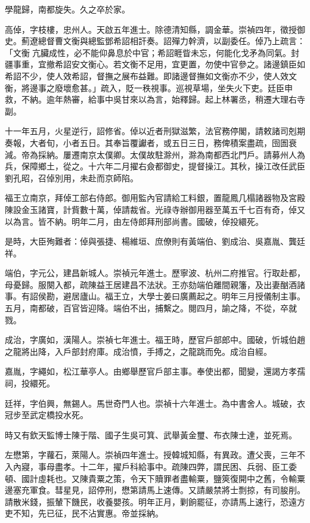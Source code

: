 \begin{pinyinscope}
學龍歸，南都旋失。久之卒於家。

高倬，字枝樓，忠州人。天啟五年進士。除德清知縣，調金華。崇禎四年，徵授御史。薊遼總督曹文衡與總監鄧希詔相訐奏。詔殫力幹濟，以副委任。倬乃上疏言：「文衡亢臟成性，必不能仰鼻息於中官；希詔睚眥未忘，何能化戈矛為同氣。封疆事重，宜撤希詔安文衡心。若文衡不足用，宜更置，勿使中官參之。諸邊鎮臣如希詔不少，使人效希詔，督撫之展布益難。即諸邊督撫如文衡亦不少，使人效文衡，將邊事之廢壞愈甚。」疏入，貶一秩視事。巡視草場，坐失火下吏。廷臣申救，不納。逾年熱審，給事中吳甘來以為言，始釋歸。起上林署丞，稍遷大理右寺副。

十一年五月，火星逆行，詔修省。倬以近者刑獄滋繁，法官務停閣，請敕諸司剋期奏報，大者旬，小者五日。其奉旨覆讞者，或五日三日，務俾積案盡疏，囹圄衰減。帝為採納。屢遷南京太僕卿。太僕故駐滁州，滁為南都西北門戶。請募州人為兵，保障鄉土，從之。十六年二月擢右僉都御史，提督操江。其秋，操江改任武臣劉孔昭，召倬別用，未赴而京師陷。

福王立南京，拜倬工部右侍郎。御用監內官請給工料銀，置龍鳳几榻諸器物及宮殿陳設金玉諸寶，計貲數十萬，倬請裁省。光祿寺辦御用器至萬五千七百有奇，倬又以為言。皆不納。明年二月，由左侍郎拜刑部尚書。國破，倬投繯死。

是時，大臣殉難者：倬與張捷、楊維垣、庶僚則有黃端伯、劉成治、吳嘉胤、龔廷祥。

端伯，字元公，建昌新城人。崇禎元年進士。歷寧波、杭州二府推官。行取赴都，母憂歸。服闋入都，疏陳益王居建昌不法狀。王亦劾端伯離間親籓，及出妻酗酒諸事。有詔侯勘，避居廬山。福王立，大學士姜曰廣薦起之。明年三月授儀制主事。五月，南都破，百官皆迎降。端伯不出，捕繫之。閱四月，諭之降，不從，卒就戮。

成治，字廣如，漢陽人。崇禎七年進士。福王時，歷官戶部郎中。國破，忻城伯趙之龍將出降，入戶部封府庫。成治憤，手搏之，之龍跳而免。成治自經。

嘉胤，字繩如，松江華亭人。由鄉舉歷官戶部主事。奉使出都，聞變，還謁方孝孺祠，投繯死。

廷祥，字伯興，無錫人。馬世奇門人也。崇禎十六年進士。為中書舍人。城破，衣冠步至武定橋投水死。

時又有欽天監博士陳于階、國子生吳可箕、武舉黃金璽、布衣陳士達，並死焉。

左懋第，字蘿石，萊陽人。崇禎四年進士。授韓城知縣，有異政。遭父喪，三年不入內寢，事母盡孝。十二年，擢戶科給事中。疏陳四弊，謂民困、兵弱、臣工委頓、國計虛耗也。又陳貴粟之策，令天下贖罪者盡輸粟，鹽筴復開中之舊，令輸粟邊塞充軍食。彗星見，詔停刑，懋第請馬上速傳。又請嚴禁將士剽掠，有司朘削。請散米錢，振輦下饑民，收養嬰孩。明年正月，剿餉罷征，亦請馬上速行，恐遠方吏不知，先已征，民不沾實惠。帝並採納。


\end{pinyinscope}
